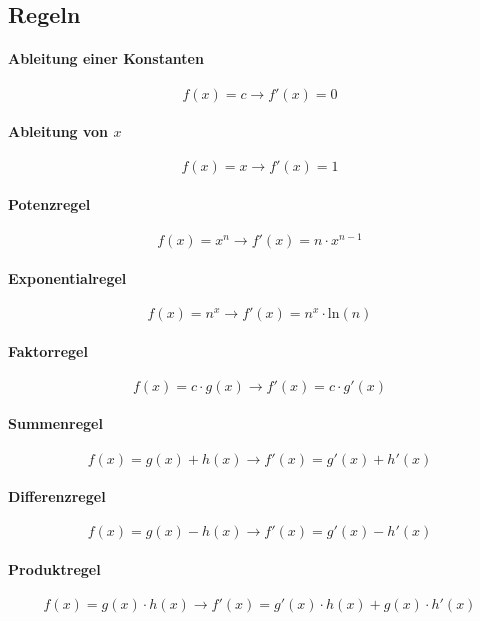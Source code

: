 		\subsection{Regeln}
			\paragraph{Ableitung einer Konstanten}
				\[ f(x) = c \rightarrow f'(x) = 0 \]

			\paragraph{Ableitung von $ x $}
				\[ f(x) = x \rightarrow f'(x) = 1 \]

			\paragraph{Potenzregel}
				\[ f(x) = x ^ n \rightarrow f'(x) = n \cdot x ^ { n - 1 } \]

			\paragraph{Exponentialregel}
				\[ f(x) = n ^ x \rightarrow f'(x) = n ^ x \cdot \text{ln}(n) \]

			\paragraph{Faktorregel}
				\[ f(x) = c \cdot g(x) \rightarrow f'(x) = c \cdot g'(x) \]

			\paragraph{Summenregel}
				\[ f(x) = g(x) + h(x) \rightarrow f'(x) = g'(x) + h'(x) \]

			\paragraph{Differenzregel}
				\[ f(x) = g(x) - h(x) \rightarrow f'(x) = g'(x) - h'(x) \]

			\paragraph{Produktregel}
				\[ f(x) = g(x) \cdot h(x) \rightarrow f'(x) = g'(x) \cdot h(x) + g(x) \cdot h'(x) \]

